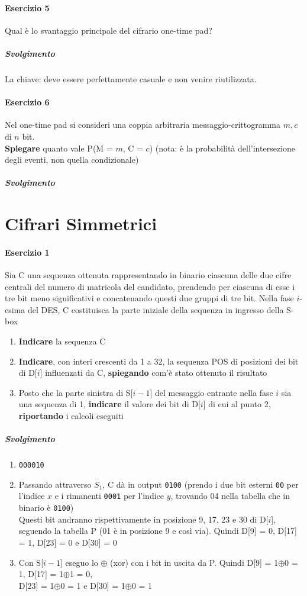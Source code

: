 \documentclass[10pt]{book}
\begin{document}
\paragraph{Esercizio 5} Qual è lo svantaggio principale del cifrario one-time pad?
\subparagraph{Svolgimento} La chiave: deve essere perfettamente casuale e non venire riutilizzata.
\paragraph{Esercizio 6} Nel one-time pad si consideri una coppia arbitraria messaggio-crittogramma $m, c$ di $n$ bit.\\
\textbf{Spiegare} quanto vale P(M = $m$, C = $c$) (nota: è la probabilità dell'intersezione degli eventi, non quella condizionale)
\subparagraph{Svolgimento}
\section{Cifrari Simmetrici}
\paragraph{Esercizio 1} Sia C una sequenza ottenuta rappresentando in binario ciascuna delle due cifre centrali del
numero di matricola del candidato, prendendo per ciascuna di esse i tre bit meno significativi e concatenando questi due gruppi di tre bit. Nella fase $i$-esima del DES, C costituisca la parte iniziale della sequenza in ingresso della S-box
\begin{enumerate}
	\item \textbf{Indicare} la sequenza C
	\item \textbf{Indicare}, con interi crescenti da 1 a 32, la sequenza POS di posizioni dei bit di D[$i$] influenzati da C, \textbf{spiegando} com'è stato ottenuto il risultato
	\item Posto che la parte sinistra di S[$i-1$] del messaggio entrante nella fase $i$ sia una sequenza di 1, \textbf{indicare} il valore dei bit di D[$i$] di cui al punto 2, \textbf{riportando} i calcoli eseguiti
\end{enumerate}
\subparagraph{Svolgimento} \begin{enumerate}
	\item \texttt{000010}
	\item Passando attraverso $S_1$, C dà in output \texttt{0100} (prendo i due bit esterni \texttt{00} per l'indice $x$ e i rimanenti \texttt{0001} per l'indice $y$, trovando 04 nella tabella che in binario è \texttt{0100})\\
	Questi bit andranno rispettivamente in posizione 9, 17, 23 e 30 di D[$i$], seguendo la tabella P (01 è in posizione 9 e così via). Quindi D[9] = 0, D[17] = 1, D[23] = 0 e D[30] = 0
	\item Con S[$i-1$] eseguo lo $\oplus$ (xor) con i bit in uscita da P. Quindi D[9] = 1$\oplus$0 = 1, D[17] = 1$\oplus$1 = 0,\\D[23] = 1$\oplus$0 = 1 e D[30] = 1$\oplus$0 = 1
\end{enumerate}
\end{document}
